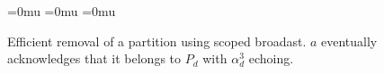 
\begin{figure}[t]
  \newcommand{\SCALE}{0.8}

  \newcommand\X{38pt}
  \newcommand\Y{-40pt}

  \thickmuskip=0mu
  \medmuskip=0mu
  \thinmuskip=0mu

  \newcommand\ADD{\alpha}
  \newcommand\DEL{\delta}
    
  \newcommand{\LEFT}{\triangleleft}
  \newcommand{\RIGHT}{\triangleright}
  
  \begin{center}
    \hspace{3pt}
  \end{center}
  \caption{\label{fig:del}Efficient removal of a partition using
    scoped broadast. $a$ eventually acknowledges that it belongs to $P_d$ with $\alpha_d^3$ echoing.}
\end{figure}


